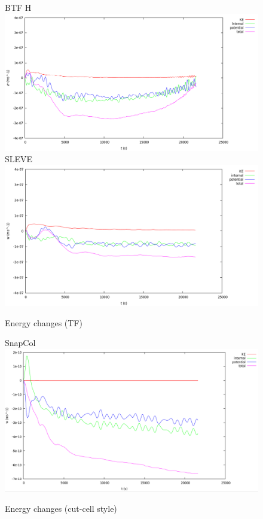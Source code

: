 \begin{figure}
BTF H
\includegraphics[width=\textwidth]{interim-results/restingBtfHEnergy.png}
SLEVE
\includegraphics[width=\textwidth]{interim-results/restingSleveEnergy.png}
\caption{Energy changes (TF)}
\label{fig:rest:energy-tf}
\end{figure}

\begin{figure}
SnapCol
\includegraphics[width=\textwidth]{interim-results/restingSnapColEnergy.png}
\caption{Energy changes (cut-cell style)}
\label{fig:rest:energy-cut-cell}
\end{figure}

